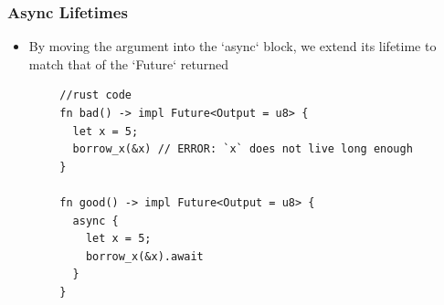 \begin{frame}[fragile]
    \frametitle{Async Lifetimes}
    \begin{itemize}
        \item By moving the argument into the `async` block, we extend its lifetime to match that of the `Future` returned
    \end{itemize}
    \begin{block}{}
        \begin{verbatim}
        //rust code
        fn bad() -> impl Future<Output = u8> {
          let x = 5;
          borrow_x(&x) // ERROR: `x` does not live long enough
        }
        
        fn good() -> impl Future<Output = u8> {
          async {
            let x = 5;
            borrow_x(&x).await
          }
        }
        \end{verbatim}
    \end{block}
    
\end{frame}

